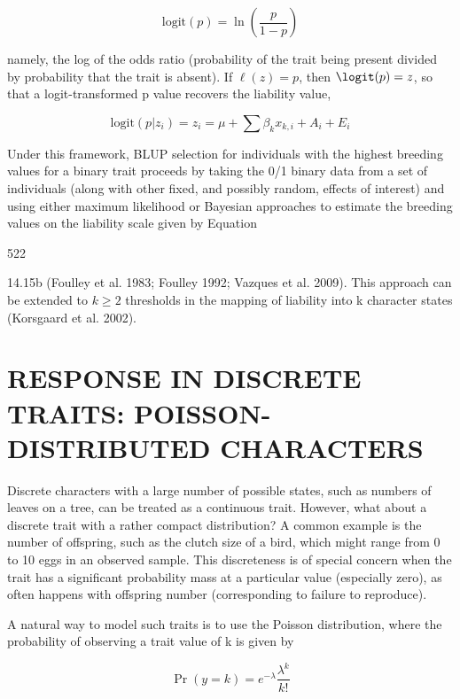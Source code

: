 \documentclass{article}
\begin{document}
\begin{equation}
\mathrm{logit}(p)=\ln\left(\frac{p}{1-p}\right)
\tag{14.15a}
\label{eq:14_15a}
\end{equation}

namely, the log of the odds ratio (probability of the trait being present divided by probability that the trait is absent). If  $ \ell(z) = p $, then  $ \logit(p) = z $, so that a logit-transformed p value recovers the liability value,

\begin{equation}
\mathrm{logit}(p|z_{i})=z_{i}=\mu+\sum\beta_{k}x_{k,i}+A_{i}+E_{i}
\tag{14.15b}
\label{eq:14_15b}
\end{equation}

Under this framework, BLUP selection for individuals with the highest breeding values for a binary trait proceeds by taking the 0/1 binary data from a set of individuals (along with other fixed, and possibly random, effects of interest) and using either maximum likelihood or Bayesian approaches to estimate the breeding values on the liability scale given by Equation

522

14.15b (Foulley et al. 1983; Foulley 1992; Vazques et al. 2009). This approach can be extended to  $ k \geq 2 $ thresholds in the mapping of liability into k character states (Korsgaard et al. 2002).

\section{RESPONSE IN DISCRETE TRAITS: POISSON-DISTRIBUTED CHARACTERS}
Discrete characters with a large number of possible states, such as numbers of leaves on a tree, can be treated as a continuous trait. However, what about a discrete trait with a rather compact distribution? A common example is the number of offspring, such as the clutch size of a bird, which might range from 0 to 10 eggs in an observed sample. This discreteness is of special concern when the trait has a significant probability mass at a particular value (especially zero), as often happens with offspring number (corresponding to failure to reproduce).

A natural way to model such traits is to use the Poisson distribution, where the probability of observing a trait value of k is given by

\begin{equation}
\Pr(y=k)=e^{-\lambda}\frac{\lambda^{k}}{k!}
\tag{14.16}
\label{eq:14_16}
\end{equation}
\end{document}
